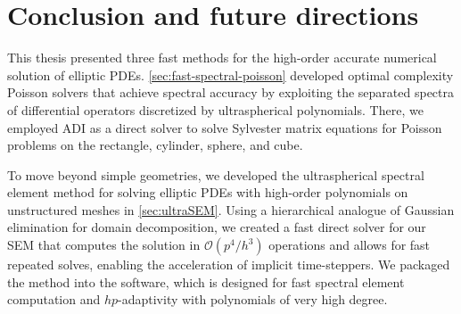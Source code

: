 \graphicspath{{chapters/\chap/figures/}}
\makeatletter
{}
\makeatother

\chapter{Conclusion and future directions}\label{sec:\chap}


This thesis presented three fast methods for the high-order accurate numerical solution of elliptic PDEs. \cref{sec:fast-spectral-poisson} developed optimal complexity Poisson solvers that achieve spectral accuracy by exploiting the separated spectra of differential operators discretized by ultraspherical polynomials. There, we employed ADI as a direct solver to solve Sylvester matrix equations for Poisson problems on the rectangle, cylinder, sphere, and cube.

To move beyond simple geometries, we developed the ultraspherical spectral element method for solving elliptic PDEs with high-order polynomials on unstructured meshes in \cref{sec:ultraSEM}. Using a hierarchical analogue of Gaussian elimination for domain decomposition, we created a fast direct solver for our SEM that computes the solution in $\mathcal{O}(p^4/h^3)$ operations and allows for fast repeated solves, enabling the acceleration of implicit time-steppers. We packaged the method into the \ultraSEM software, which is designed for fast spectral element computation and $hp$-adaptivity with polynomials of very high degree.

